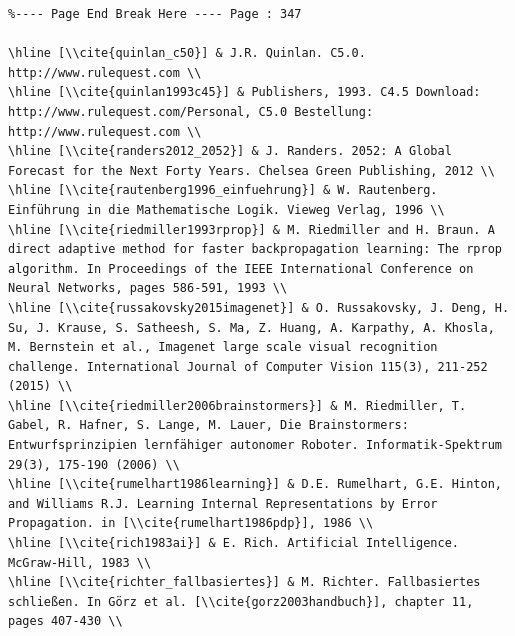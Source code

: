 \documentclass[10pt]{book}
\begin{document}
\begin{verbatim}
%---- Page End Break Here ---- Page : 347

\hline [\\cite{quinlan_c50}] & J.R. Quinlan. C5.0. http://www.rulequest.com \\
\hline [\\cite{quinlan1993c45}] & Publishers, 1993. C4.5 Download: http://www.rulequest.com/Personal, C5.0 Bestellung: http://www.rulequest.com \\
\hline [\\cite{randers2012_2052}] & J. Randers. 2052: A Global Forecast for the Next Forty Years. Chelsea Green Publishing, 2012 \\
\hline [\\cite{rautenberg1996_einfuehrung}] & W. Rautenberg. Einführung in die Mathematische Logik. Vieweg Verlag, 1996 \\
\hline [\\cite{riedmiller1993rprop}] & M. Riedmiller and H. Braun. A direct adaptive method for faster backpropagation learning: The rprop algorithm. In Proceedings of the IEEE International Conference on Neural Networks, pages 586-591, 1993 \\
\hline [\\cite{russakovsky2015imagenet}] & O. Russakovsky, J. Deng, H. Su, J. Krause, S. Satheesh, S. Ma, Z. Huang, A. Karpathy, A. Khosla, M. Bernstein et al., Imagenet large scale visual recognition challenge. International Journal of Computer Vision 115(3), 211-252 (2015) \\
\hline [\\cite{riedmiller2006brainstormers}] & M. Riedmiller, T. Gabel, R. Hafner, S. Lange, M. Lauer, Die Brainstormers: Entwurfsprinzipien lernfähiger autonomer Roboter. Informatik-Spektrum 29(3), 175-190 (2006) \\
\hline [\\cite{rumelhart1986learning}] & D.E. Rumelhart, G.E. Hinton, and Williams R.J. Learning Internal Representations by Error Propagation. in [\\cite{rumelhart1986pdp}], 1986 \\
\hline [\\cite{rich1983ai}] & E. Rich. Artificial Intelligence. McGraw-Hill, 1983 \\
\hline [\\cite{richter_fallbasiertes}] & M. Richter. Fallbasiertes schließen. In Görz et al. [\\cite{gorz2003handbuch}], chapter 11, pages 407-430 \\

\end{verbatim}
\end{document}

